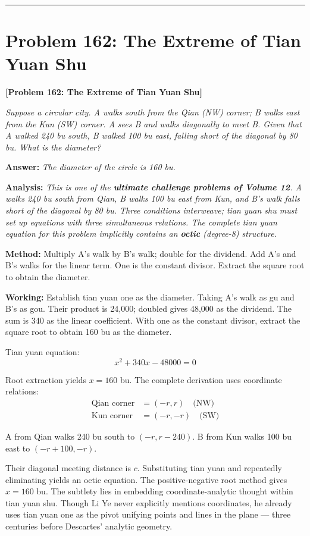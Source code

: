 \documentclass[11pt,a4paper]{book}
\newcommand{\answer}[1]{\noindent\textbf{\color{anacolor}Answer: }\textit{#1}\par}
\newcommand{\method}[1]{\noindent\textbf{\color{methodcolor}Method: }#1\par}
\newcommand{\working}[1]{\noindent\textbf{\color{workcolor}Working: }#1\par}
\newcommand{\analysis}[1]{\noindent\textbf{\color{anacolor}Analysis: }\textit{#1}\par}
\newcommand{\shortline}{\noindent\rule{0.5\textwidth}{0.4pt}\par}
\begin{document}
\shortline

\section{Problem 162: The Extreme of Tian Yuan Shu}
\label{sec:prob162}

\noindent\textbf{\color{probcolor}[Problem 162: The Extreme of Tian Yuan Shu]}

\textit{Suppose a circular city. A walks south from the Qian (NW) corner; B walks east from the Kun (SW) corner. A sees B and walks diagonally to meet B. Given that A walked 240 bu south, B walked 100 bu east, falling short of the diagonal by 80 bu. What is the diameter?}

\answer{The diameter of the circle is 160 bu.}

\analysis{This is one of the \textbf{ultimate challenge problems of Volume 12}. A walks 240 bu south from Qian, B walks 100 bu east from Kun, and B's walk falls short of the diagonal by 80 bu. Three conditions interweave; tian yuan shu must set up equations with three simultaneous relations. The complete tian yuan equation for this problem implicitly contains an \textbf{octic} (degree-8) structure.}

\method{Multiply A's walk by B's walk; double for the dividend. Add A's and B's walks for the linear term. One is the constant divisor. Extract the square root to obtain the diameter.}

\working{Establish tian yuan one as the diameter. Taking A's walk as gu and B's as gou. Their product is 24,000; doubled gives 48,000 as the dividend. The sum is 340 as the linear coefficient. With one as the constant divisor, extract the square root to obtain 160 bu as the diameter.

Tian yuan equation:
$$x^2 + 340x - 48000 = 0$$

Root extraction yields $x = 160$ bu. The complete derivation uses coordinate relations:
\begin{align*}
\text{Qian corner} &= (-r, r) \quad \text{(NW)} \\
\text{Kun corner} &= (-r, -r) \quad \text{(SW)}
\end{align*}

A from Qian walks 240 bu south to $(-r, r - 240)$.
B from Kun walks 100 bu east to $(-r + 100, -r)$.

Their diagonal meeting distance is $c$. Substituting tian yuan and repeatedly eliminating yields an octic equation. The positive-negative root method gives $x = 160$ bu. The subtlety lies in embedding coordinate-analytic thought within tian yuan shu. Though Li Ye never explicitly mentions coordinates, he already uses tian yuan one as the pivot unifying points and lines in the plane --- three centuries before Descartes' analytic geometry.}
\end{document}
